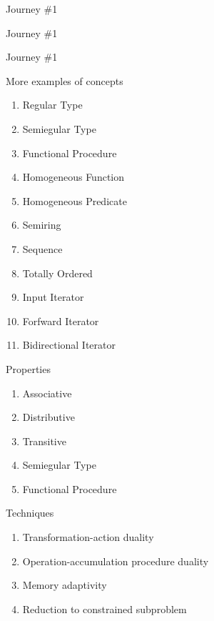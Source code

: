 \documentclass[10pt]{beamer}
\begin{document}
\begin{frame}{Journey \#1}
    \begin{block}{}
		
	\end{block}
\end{frame}

\begin{frame}{Journey \#1}
    \begin{block}{}
		
	\end{block}
\end{frame}
\begin{frame}{Journey \#1}
    \begin{block}{}
		
	\end{block}
\end{frame}


\begin{frame}{More examples of concepts}
\begin{enumerate}
  \item Regular Type
  \item Semiegular Type
  \item Functional Procedure
  \item Homogeneous Function
  \item Homogeneous Predicate
  \item Semiring
  \item Sequence
  \item Totally Ordered
  \item Input Iterator
  \item Forfward Iterator
  \item Bidirectional Iterator
\end{enumerate}
\end{frame}

\begin{frame}{Properties}
\begin{enumerate}
  \item Associative
  \item Distributive
  \item Transitive
  \item Semiegular Type
  \item Functional Procedure
\end{enumerate}
\end{frame}

\begin{frame}{Techniques}
\begin{enumerate}
  \item Transformation-action duality
  \item Operation-accumulation procedure duality
  \item Memory adaptivity
  \item Reduction to constrained subproblem 
\end{enumerate}
\end{frame}
\end{document}
